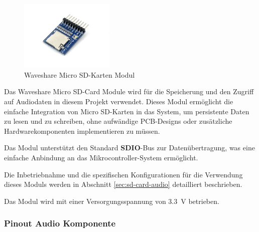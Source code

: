 \begin{figure} %
	\vspace{-20pt}
	\centering
	\includegraphics[width=0.4\textwidth]{images/05_technische_spezifikation/audio/waveshare_micro_sd_module.jpg}
	\caption{Waveshare Micro SD-Karten Modul}
	\label{fig:waveshare_micro_sd_module}
\end{figure}

Das Waveshare Micro SD-Card Module wird für die Speicherung und den Zugriff auf Audiodaten in diesem Projekt verwendet. Dieses Modul ermöglicht die einfache Integration von Micro SD-Karten in das System, um persistente Daten zu lesen und zu schreiben, ohne aufwändige PCB-Designs oder zusätzliche Hardwarekomponenten implementieren zu müssen.

Das Modul unterstützt den Standard \textbf{SDIO}-Bus zur Datenübertragung, was eine einfache Anbindung an das Mikrocontroller-System ermöglicht. 

Die Inbetriebnahme und die spezifischen Konfigurationen für die Verwendung dieses Moduls werden in Abschnitt \ref{sec:sd-card-audio} detailliert beschrieben. 

Das Modul wird mit einer Versorgungsspannung von \SI{3.3}{\volt} betrieben.

\newpage
\subsubsection{Pinout Audio Komponente}

